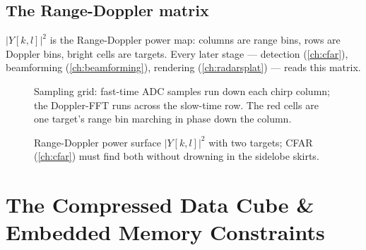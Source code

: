\documentclass[11pt,oneside]{book}
\begin{document}
\section{The Range-Doppler matrix}
\label{sec:rd-matrix}

$|Y[k,l]|^2$ is the Range-Doppler power map: columns are range bins,
rows are Doppler bins, bright cells are targets. Every later stage ---
detection (\cref{ch:cfar}), beamforming (\cref{ch:beamforming}), rendering
(\cref{ch:radarsplat}) --- reads this matrix.

\begin{figure}[htbp]
\centering
{}
\caption{Sampling grid: fast-time ADC samples run down each chirp column;
the Doppler-FFT runs across the slow-time row. The red cells are one
target's range bin marching in phase down the column.}
\label{fig:sampling-grid}
\end{figure}

\begin{figure}[htbp]
\centering
{}
\caption{Range-Doppler power surface $|Y[k,l]|^2$ with two targets; CFAR
(\cref{ch:cfar}) must find both without drowning in the sidelobe skirts.}
\label{fig:rd-surface}
\end{figure}

\chapter{The Compressed Data Cube \& Embedded Memory Constraints}
\label{ch:cdc}
\end{document}
